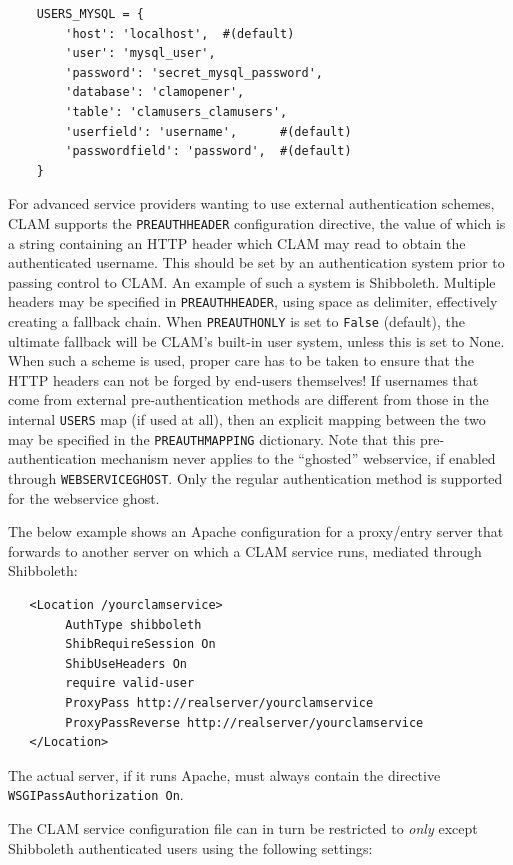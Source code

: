 \documentclass[a4paper,12pt]{report}
\begin{document}
\begin{verbatim}
    USERS_MYSQL = {
        'host': 'localhost',  #(default)
        'user': 'mysql_user',        
        'password': 'secret_mysql_password',
        'database': 'clamopener',
        'table': 'clamusers_clamusers',
        'userfield': 'username',      #(default)
        'passwordfield': 'password',  #(default)
    }
\end{verbatim}

For advanced service providers wanting to use external authentication schemes,
CLAM supports the \texttt{PREAUTHHEADER} configuration directive, the value of
which is a string containing an HTTP header which CLAM may read to obtain the
authenticated username. This should be set by an authentication system prior to
passing control to CLAM. An example of such a system is Shibboleth. Multiple
headers may be specified in \texttt{PREAUTHHEADER}, using space as delimiter,
effectively creating a fallback chain. When \texttt{PREAUTHONLY} is set to
\texttt{False} (default), the ultimate fallback will be CLAM's built-in user
system, unless this is set to None. When such a scheme is used, proper care has
to be taken to ensure that the HTTP headers can not be forged by end-users
themselves! If usernames that come from external pre-authentication methods are
different from those in the internal \texttt{USERS} map (if used at all), then
an explicit mapping between the two may be specified in the
\texttt{PREAUTHMAPPING} dictionary. Note that this pre-authentication mechanism
never applies to the ``ghosted'' webservice, if enabled through
\texttt{WEBSERVICEGHOST}. Only the regular authentication method is supported
for the webservice ghost.

The below example shows an Apache configuration for a proxy/entry server that
forwards to another server on which a CLAM service runs, mediated through
Shibboleth:

\begin{verbatim}
   <Location /yourclamservice>
        AuthType shibboleth
        ShibRequireSession On
        ShibUseHeaders On
        require valid-user
        ProxyPass http://realserver/yourclamservice
        ProxyPassReverse http://realserver/yourclamservice
   </Location>
\end{verbatim}

The actual server, if it runs Apache, must always contain the directive
\texttt{WSGIPassAuthorization On}.

The CLAM service configuration file can in turn be restricted to \emph{only}
except Shibboleth authenticated users using the following settings:
\end{document}
